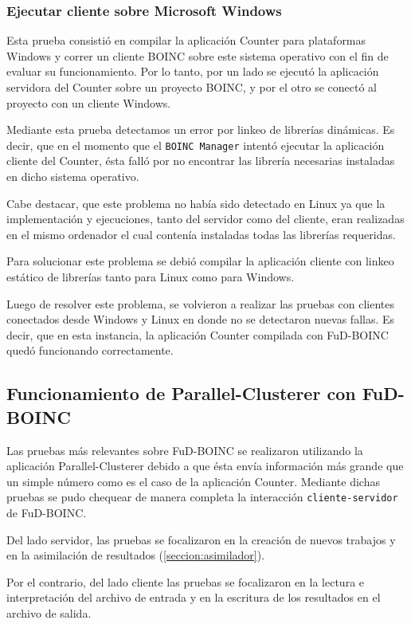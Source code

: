 \subsubsection{Ejecutar cliente sobre Microsoft Windows} 
Esta prueba consistió en compilar la aplicación Counter para plataformas Windows y correr un cliente BOINC sobre este sistema operativo con el fin de evaluar su funcionamiento. Por lo tanto, por un lado se ejecutó la aplicación servidora del Counter sobre un proyecto BOINC, y por el otro se conectó al proyecto con un cliente Windows. 

Mediante esta prueba detectamos un error por linkeo de librerías dinámicas. Es decir, que en el momento que el \texttt{BOINC Manager} intentó ejecutar la aplicación cliente del Counter, ésta falló por no encontrar las librería necesarias instaladas en dicho sistema operativo. 

Cabe destacar, que este problema no había sido detectado en Linux ya que la implementación y ejecuciones, tanto del servidor como del cliente, eran realizadas en el mismo ordenador el cual contenía instaladas todas las librerías requeridas.

Para solucionar este problema se debió compilar la aplicación cliente con linkeo estático de librerías tanto para Linux como para Windows.

Luego de resolver este problema, se volvieron a realizar las pruebas con clientes conectados desde Windows y Linux en donde no se detectaron nuevas fallas. Es decir, que en esta instancia, la aplicación Counter compilada con FuD-BOINC quedó funcionando correctamente.


\subsection{Funcionamiento de Parallel-Clusterer con FuD-BOINC}

Las pruebas más relevantes sobre FuD-BOINC se realizaron utilizando la aplicación Parallel-Clusterer debido a que ésta envía información más grande que un simple número como es el caso de la aplicación Counter. Mediante dichas pruebas se pudo chequear de manera completa la interacción \texttt{cliente-servidor} de FuD-BOINC. 

Del lado servidor, las pruebas se focalizaron en la creación de nuevos trabajos y en la asimilación de resultados (\ref{seccion:asimilador}). 

Por el contrario, del lado cliente las pruebas se focalizaron en la lectura e interpretación del archivo de entrada y en la escritura de los resultados en el archivo de salida. 

